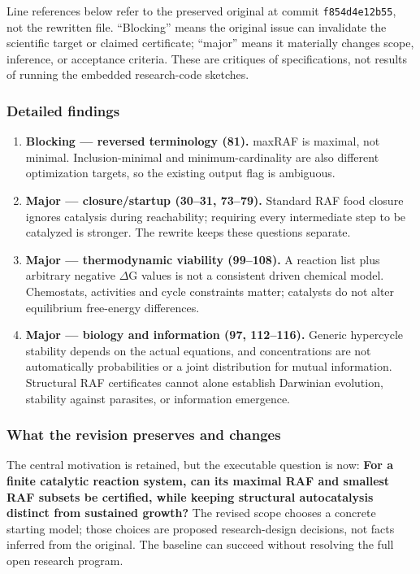 \documentclass[
  11pt,
]{article}
\begin{document}
Line references below refer to the preserved original at commit
\texttt{f854d4e12b55}, not the rewritten file. ``Blocking'' means the
original issue can invalidate the scientific target or claimed
certificate; ``major'' means it materially changes scope, inference, or
acceptance criteria. These are critiques of specifications, not results
of running the embedded research-code sketches.

\subsubsection{Detailed findings}

\begin{enumerate}
\def\labelenumi{\arabic{enumi}.}
\item
  \textbf{Blocking --- reversed terminology (81).} maxRAF is maximal,
  not minimal. Inclusion-minimal and minimum-cardinality are also
  different optimization targets, so the existing output flag is
  ambiguous.
\item
  \textbf{Major --- closure/startup (30--31, 73--79).} Standard RAF food
  closure ignores catalysis during reachability; requiring every
  intermediate step to be catalyzed is stronger. The rewrite keeps these
  questions separate.
\item
  \textbf{Major --- thermodynamic viability (99--108).} A reaction list
  plus arbitrary negative \ensuremath{\Delta}G values is not a
  consistent driven chemical model. Chemostats, activities and cycle
  constraints matter; catalysts do not alter equilibrium free-energy
  differences.
\item
  \textbf{Major --- biology and information (97, 112--116).} Generic
  hypercycle stability depends on the actual equations, and
  concentrations are not automatically probabilities or a joint
  distribution for mutual information. Structural RAF certificates
  cannot alone establish Darwinian evolution, stability against
  parasites, or information emergence.
\end{enumerate}

\subsubsection{What the revision preserves and changes}

The central motivation is retained, but the executable question is now:
\textbf{For a finite catalytic reaction system, can its maximal RAF and
smallest RAF subsets be certified, while keeping structural
autocatalysis distinct from sustained growth?} The revised scope chooses
a concrete starting model; those choices are proposed research-design
decisions, not facts inferred from the original. The baseline can
succeed without resolving the full open research program.
\end{document}
